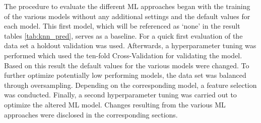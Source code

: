 The procedure to evaluate the different ML approaches began with the training of the various models without any additional settings and the default values for each model. This first model, which will be referenced as \enquote*{none} in the result tables \ref{tab:knn_pred}, serves as a baseline. For a quick first evaluation of the data set a holdout validation was used. Afterwards, a hyperparameter tuning was performed which used the ten-fold Cross-Validation for validating the model. %
Based on this result the default values for the various models were changed. To further optimize potentially low performing models, the data set was balanced through oversampling. Depending on the corresponding model, a feature selection was conducted. Finally, a second hyperparameter tuning was carried out to optimize the altered ML model. Changes resulting from the various ML approaches were disclosed in the corresponding sections.


